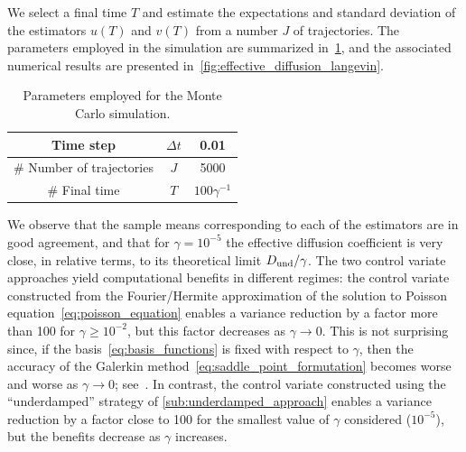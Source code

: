 \documentclass[11pt,a4paper]{article}
\newcommand{\e}{\mathrm{e}}
\newcommand{\expect}[0]{\mathbf{E}}
\renewcommand{\d}{\mathrm d}
\theoremstyle{plain}
\numberwithin{equation}{section}
\renewcommand{\geq}{\geqslant}
\begin{document}

We select a final time $T$ and estimate the expectations and standard deviation of the estimators $u(T)$ and $v(T)$ from a number $J$ of trajectories.
The parameters employed in the simulation are summarized in~\cref{table:parameters_employed_for_mc},
and the associated numerical results are presented in~\cref{fig:effective_diffusion_langevin}.
\begin{table}[ht]
    \centering
    \begin{tabular}{|c|c|c|}
        \hline
        Time step & $\Delta t$ & 0.01 \\
        \hline
        \# Number of trajectories & $J$ & 5000 \\
        \hline
        \# Final time & $T$ & $100 \gamma^{-1}$ \\
        \hline
    \end{tabular}
    \caption{Parameters employed for the Monte Carlo simulation.}
    \label{table:parameters_employed_for_mc}
\end{table}
We observe that the sample means corresponding to each of the estimators are in good agreement,
and that for $\gamma = 10^{-5}$ the effective diffusion coefficient is very close, in relative terms,
to its theoretical limit $D_{\rm und}/\gamma$.
The two control variate approaches yield computational benefits in different regimes:
the control variate constructed from the Fourier/Hermite approximation of the solution to Poisson equation~\eqref{eq:poisson_equation}
enables a variance reduction by a factor more than 100 for $\gamma \geq 10^{-2}$,
but this factor decreases as $\gamma \to 0$.
This is not surprising since,
if the basis~\eqref{eq:basis_functions} is fixed with respect to $\gamma$,
then the accuracy of the Galerkin method~\eqref{eq:saddle_point_formutation} becomes worse and worse as $\gamma \to 0$;
see~\cite{roussel2018spectral}.
In contrast, the control variate constructed using the ``underdamped'' strategy of \cref{sub:underdamped_approach} enables a variance reduction by a factor close to 100 for the smallest value of $\gamma$ considered ($10^{-5}$),
but the benefits decrease as $\gamma$ increases.
\end{document}
